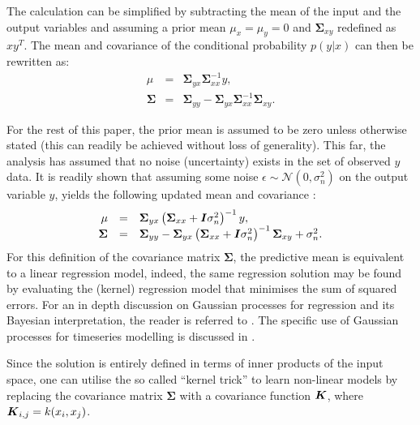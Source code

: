 \documentclass[useAMS,usenatbib,fleqn]{mn2e}
\begin{document}
The calculation can be simplified by subtracting the mean of the input and the output variables and assuming a prior mean $\mu_{x}=\mu_{y}=0$ and $\mathbf\Sigma_{xy}$ redefined as $xy^{T}$. The mean and covariance of the conditional probability $p(y|x)$ can then be rewritten as:
\begin{equation}
\label{eq-conditional-zero-mean}
\begin{array}{rcl}
\mu 		&=&		\mathbf\Sigma_{yx}\mathbf\Sigma_{xx}^{-1}y,\\
\mathbf\Sigma 	&=& 	\mathbf\Sigma_{yy}-\mathbf\Sigma_{yx}\mathbf\Sigma_{xx}^{-1}\mathbf\Sigma_{xy}.
\end{array}
\end{equation}

For the rest of this paper, the prior mean is assumed to be zero unless otherwise stated (this can readily be achieved without loss of generality). This far, the analysis has assumed that no noise (uncertainty) exists in the set of observed $y$ data. It is readily shown that assuming some noise $\epsilon \sim \mathcal{N}\left(0,\sigma_{n}^{2}\right)$ on the output variable $y$, yields the following updated mean and covariance \citep{rasmussen2006gaussian}:
\begin{equation}
\label{eq-mean-variance-noise}
\begin{array}{rcl}
\mu &=& \mathbf\Sigma_{yx}\left(\mathbf\Sigma_{xx}+\bmath{I}\sigma_{n}^{2}\right)^{-1}y,\\
\mathbf\Sigma &=& \mathbf\Sigma_{yy}-\mathbf\Sigma_{yx}\left(\mathbf\Sigma_{xx}+\bmath{I}\sigma_{n}^{2}\right)^{-1}\mathbf\Sigma_{xy}+\sigma_{n}^{2}.
\end{array}
\end{equation}
For this definition of the covariance matrix $\mathbf\Sigma$, the predictive mean is equivalent to a linear regression model, indeed, the same regression solution may be found by evaluating the (kernel) regression model that minimises the sum of squared errors. For an in depth discussion on Gaussian processes for regression and its Bayesian interpretation, the reader is referred to \citep{rasmussen2006gaussian}. The specific use of Gaussian processes for timeseries modelling is discussed in \citep{roberts2012rs}.

Since the solution is entirely defined in terms of inner products of the input space, one can utilise the so called ``kernel trick'' to learn non-linear models by replacing the covariance matrix $\mathbf\Sigma$ with a covariance function $\bmath{K}$, where $\bmath{K}_{i,j} = k(x_{i},x_{j})$.
\end{document}
